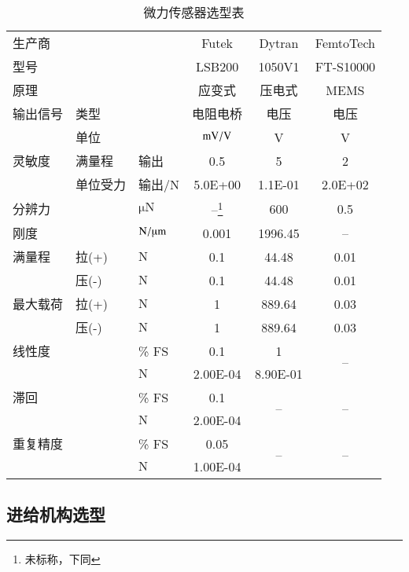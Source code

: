 \begin{table}[htbp]
\begin{minipage}{1\linewidth}
\centering
\caption{微力传感器选型表}
\label{tab:rig-probe-sensor}
\begin{tabular}{@{}lllccc@{}}
\toprule[1.5pt]
生产商 &  &  & Futek & Dytran & FemtoTech \\
型号 &  &  & LSB200 & 1050V1 & FT-S10000 \\
\midrule[1pt]
原理 &  &  & 应变式 & 压电式 & MEMS \\
输出信号 & 类型 &  & 电阻电桥 & 电压 & 电压 \\
 & 单位 &  & $\si[per-mode=symbol]{\milli\volt\per\volt}$ & V & V \\
灵敏度 & 满量程 & 输出 & 0.5 & 5 & 2 \\
 & 单位受力 & 输出/$\si{\newton}$ & 5.0E+00 & 1.1E-01 & 2.0E+02 \\
分辨力 &  & $\si{\micro\newton}$ & --\footnote{未标称，下同} & 600 & 0.5 \\
刚度 &  & $\si[per-mode=symbol]{\newton\per\micro\meter}$ & 0.001 & 1996.45 & -- \\
\midrule[1pt]
满量程 & 拉(+) & $\si{\newton}$ & 0.1 & 44.48 & 0.01 \\
 & 压(-) & $\si{\newton}$ & 0.1 & 44.48 & 0.01 \\
最大载荷 & 拉(+) & $\si{\newton}$ & 1 & 889.64 & 0.03 \\
 & 压(-) & $\si{\newton}$ & 1 & 889.64 & 0.03 \\
\midrule[1pt]
线性度 &  & \% FS & 0.1 & 1 & \multirow{2}{*}{--} \\
 &  & $\si{\newton}$ & 2.00E-04 & 8.90E-01 &  \\
滞回 &  & \% FS & 0.1 & \multirow{2}{*}{--} & \multirow{2}{*}{--} \\
 &  & $\si{\newton}$ & 2.00E-04 &  &  \\
重复精度 &  & \% FS & 0.05 & \multirow{2}{*}{--} & \multirow{2}{*}{--} \\
 &  & $\si{\newton}$ & 1.00E-04 &  &  \\
\bottomrule[1.5pt]
\end{tabular}
\end{minipage}
\end{table}


\subsection{进给机构选型}\label{sec:rig-probe-feeding}

